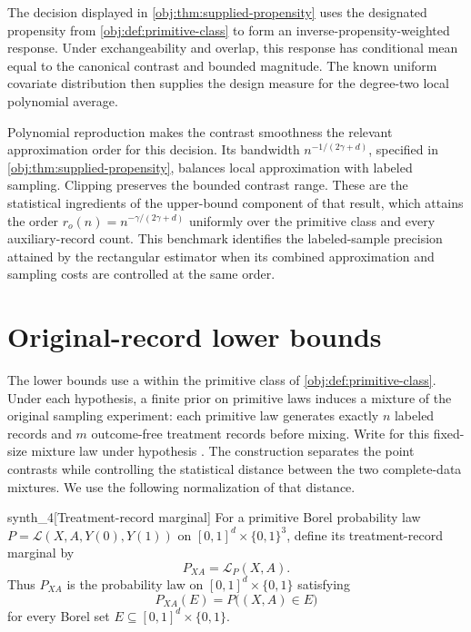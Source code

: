 \documentclass[11pt]{article}
\begin{document}
The decision displayed in \cref{obj:thm:supplied-propensity} uses the designated propensity from \cref{obj:def:primitive-class} to form an inverse-propensity-weighted response. Under exchangeability and overlap, this response has conditional mean equal to the canonical contrast and bounded magnitude. The known uniform covariate distribution then supplies the design measure for the degree-two local polynomial average.

Polynomial reproduction makes the contrast smoothness the relevant approximation order for this decision. Its bandwidth \(n^{-1/(2\gamma+d)}\), specified in \cref{obj:thm:supplied-propensity}, balances local approximation with labeled sampling. Clipping preserves the bounded contrast range. These are the statistical ingredients of the upper-bound component of that result, which attains the order \(r_o(n)=n^{-\gamma/(2\gamma+d)}\) uniformly over the primitive class and every auxiliary-record count. This benchmark identifies the labeled-sample precision attained by the rectangular estimator when its combined approximation and sampling costs are controlled at the same order.


\section{Original-record lower bounds}\label{sec:original-record-lower-bounds}

The lower bounds use a  within the primitive class of \cref{obj:def:primitive-class}. Under each hypothesis, a finite prior on primitive laws induces a mixture of the original sampling experiment: each primitive law generates exactly \(n\) labeled records and \(m\) outcome-free treatment records before mixing. Write  for this fixed-size mixture law under hypothesis . The construction separates the point contrasts while controlling the statistical distance between the two complete-data mixtures. We use the following normalization of that distance.

\begin{definitionv}{synth_4}[Treatment-record marginal]
For a primitive Borel probability law
\(P=\mathcal L(X,A,Y(0),Y(1))\) on
\([0,1]^d\times\{0,1\}^3\), define its treatment-record marginal by
\[
P_{XA}=\mathcal L_P(X,A).
\]
Thus \(P_{XA}\) is the probability law on \([0,1]^d\times\{0,1\}\) satisfying
\[
P_{XA}(E)=P\bigl((X,A)\in E\bigr)
\]
for every Borel set \(E\subseteq[0,1]^d\times\{0,1\}\).
\end{definitionv}
\end{document}
